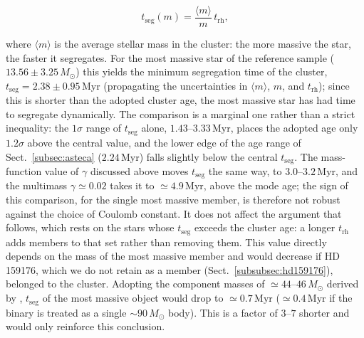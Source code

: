 \documentclass{aa}
\begin{document}
\begin{equation}\label{eq:tseg}
t_{\mathrm{seg}}(m) = \frac{\langle m \rangle}{m}\, t_{\mathrm{rh}},
\end{equation}

where $\langle m \rangle$ is the average stellar mass in the cluster: the more massive the star, the faster it segregates. For the most massive star of the reference sample ($13.56 \pm 3.25\,M_\odot$) this yields the minimum segregation time of the cluster, $t_{\mathrm{seg}} = 2.38 \pm 0.95\,\mathrm{Myr}$ (propagating the uncertainties in $\langle m \rangle$, $m$, and $t_{\mathrm{rh}}$); since this is shorter than the adopted cluster age, the most massive star has had time to segregate dynamically. The comparison is a marginal one rather than a strict inequality: the $1\sigma$ range of $t_{\mathrm{seg}}$ alone, $1.43$--$3.33\,\mathrm{Myr}$, places the adopted age only $1.2\sigma$ above the central value, and the lower edge of the age range of Sect.~\ref{subsec:asteca} ($2.24\,\mathrm{Myr}$) falls slightly below the central $t_{\mathrm{seg}}$. The mass-function value of $\gamma$ discussed above moves $t_{\mathrm{seg}}$ the same way, to $3.0$--$3.2\,\mathrm{Myr}$, and the multimass $\gamma\simeq0.02$ takes it to $\simeq4.9\,\mathrm{Myr}$, above the mode age; the sign of this comparison, for the single most massive member, is therefore not robust against the choice of Coulomb constant. It does not affect the argument that follows, which rests on the stars whose $t_{\mathrm{seg}}$ exceeds the cluster age: a longer $t_{\mathrm{rh}}$ adds members to that set rather than removing them. This value directly depends on the mass of the most massive member and would decrease if HD 159176, which we do not retain as a member (Sect.~\ref{subsubsec:hd159176}), belonged to the cluster. Adopting the component masses of $\simeq44$--$46\,M_\odot$ derived by \citet{2016ApJ...832..211P}, $t_{\mathrm{seg}}$ of the most massive object would drop to $\simeq0.7\,\mathrm{Myr}$ ($\simeq0.4\,\mathrm{Myr}$ if the binary is treated as a single $\sim90\,M_\odot$ body). This is a factor of $3$--$7$ shorter and would only reinforce this conclusion.
\end{document}
